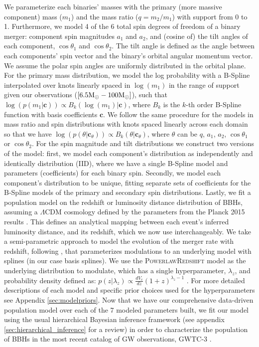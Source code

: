 We parameterize each binaries' masses with the primary (more massive component) mass ($m_1$) 
and the mass ratio ($q=m_2/m_1$) with support from 0 to 1. Furthermore, we model 4 of the 6 total 
spin degrees of freedom of a binary merger: component spin magnitudes $a_1$ and $a_2$, and (cosine of) the tilt angles of each component, $\cos{\theta_1}$ and $\cos{\theta_2}$. The tilt angle is defined as the angle between each components' spin vector and the binary's orbital angular momentum vector. 
We assume the polar spin angles are uniformly distributed in the orbital plane. For the primary mass distribution, we model the log probability with a B-Spline interpolated over 
knots linearly spaced in $\log(m_1)$ in the range of support given our observations ($[6.5{\rm M}_\odot-100{\rm M}_\odot]$), such that $\log(p(m_1 | \bm{c})) \propto B_{k}(\log(m_1) | \bm{c})$, where $B_{k}$ is the 
$k$-th order B-Spline function with basis coefficients $\bm{c}$. We follow the same procedure for the models in mass ratio and spin distributions with knots spaced linearly across each domain 
so that we have $\log(p(\theta | \bm{c}_\theta)) \propto B_{k}(\theta | \bm{c}_\theta)$, where $\theta$ can be $q$, $a_1$, $a_2$, $\cos{\theta_1}$ or $\cos{\theta_2}$. 
For the spin magnitude and tilt distributions we construct two versions of the model: first, we model  
each component's distribution as independently and identically distribution (IID), where we have a single B-Spline model and parameters (coefficients) for each binary spin. 
Secondly, we model each component's distribution to be unique, fitting separate sets of coefficients for the B-Spline models of the primary and secondary spin distributions. 
Lastly, we fit a population model on the redshift or luminosity distance distribution of BBHs, assuming a $\Lambda\mathrm{CDM}$ cosmology defined by the parameters 
from the Planck 2015 results \citep{Planck2015}. This defines an analytical mapping between each event's inferred luminosity distance, and its redshift, which we now use interchangeably. 
We take a semi-parametric approach to model the evolution of the merger rate with redshift, following \citet{Edelman_2022ApJ}, that parameterizes modulations to an underlying model 
with splines (in our case basis splines). We use the \textsc{PowerlawRedshift} model as the underlying distribution to modulate, which has a single hyperparameter, $\lambda_z$, and 
probability density defined as: $p(z|\lambda_z)\propto \frac{dV_c}{dz}(1+z)^{\lambda_z-1}$ \citep{Fishbach_2018redshift}. For more detailed descriptions of each model and 
specific prior choices used for the hyperparameters see Appendix \ref{sec:modelpriors}. Now that we have our comprehensive data-driven population model over 
each of the 7 modeled parameters built, we fit our model using the usual hierarchical Bayesian inference framework (see appendix \ref{sec:hierarchical_inference} for a review) in order to characterize 
the population of BBHs in the most recent catalog of GW observations, GWTC-3 \citep{GWTC3,o3b_astro_dist}.